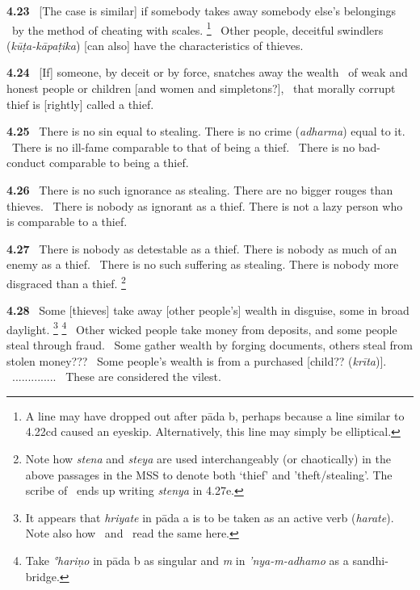 \documentclass{article}
\newcommand{\skt}[1]{\textit{#1}}
\begin{document}
\textbf{4.23}%
\ [The case is similar] if somebody takes away somebody else's belongings%
\                                          by the method of cheating with scales.%
\footnote{A line may have dropped out after pāda b, perhaps because a line                 similar to 4.22cd caused an eyeskip. Alternatively, this line may simply be                elliptical. }%
\ Other people, deceitful swindlers (\skt{kūṭa-kāpaṭika}) [can also] have the characteristics of thieves.%


\textbf{4.24}%
\ [If] someone, by deceit or by force, snatches away the wealth%
\ of weak and honest people or children [and women and simpletons?],%
\                         that morally corrupt thief is [rightly] called a thief.%


\textbf{4.25}%
\ There is no sin equal to stealing. There is no crime (\skt{adharma}) equal to it.%
\ There is no ill-fame comparable to that of being a thief.%
\                 There is no bad-conduct comparable to being a thief.%


\textbf{4.26}%
\ There is no such ignorance as stealing. There are no bigger rouges than thieves.%
\ There is nobody as ignorant as a thief. There is not a lazy person who is comparable to a thief.%


\textbf{4.27}%
\ There is nobody as detestable as a thief. There is nobody as much of an enemy as a thief.%
\ There is no such suffering as stealing. There is nobody more disgraced than a thief.%
\footnote{Note how \skt{stena} and \skt{steya} are used interchangeably (or chaotically)                        in the above passages in the MSS to denote both `thief' and 'theft/stealing'.                         The scribe of \msNc\ ends up writing \skt{stenya} in 4.27e. }%


\textbf{4.28}%
\ Some [thieves] take away [other people's] wealth in disguise, some in broad daylight.%
\footnote{It appears that \skt{hriyate} in pāda a is to be taken as an active verb (\skt{harate}).                 Note also how \msCb\ and \msNc\ read the same here. }%
\footnote{Take \skt{°hariṇo} in pāda b as singular and \skt{m} in \skt{'nya-m-adhamo} as a sandhi-bridge. }%
\ Other wicked people take money from deposits, and some people steal through fraud.%
\ Some gather wealth by forging documents, others steal from stolen money???%
\ Some people's wealth is from a purchased [child?? (\skt{krīta})].%
\                  ..............%
\                  These are considered the vilest.%
\end{document}
